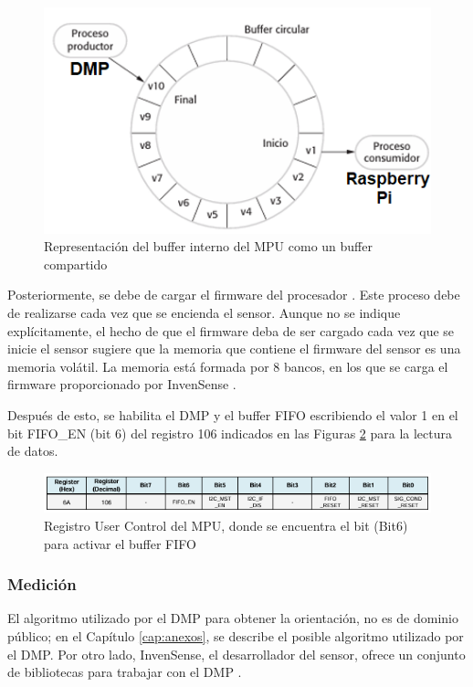 \documentclass[12pt, twoside]{report}
\begin{document}
\begin{figure}[htb]
	\centering
	\includegraphics[scale=0.9]{buffer.png}
	\caption{Representación del buffer interno del MPU como un buffer compartido}
	\label{fig:buffer}
\end{figure}

Posteriormente, se debe de cargar el firmware del procesador \cite{userguideMotionDriver}. Este proceso debe de realizarse cada vez que se encienda el sensor. Aunque no se indique explícitamente, el hecho de que el firmware deba de ser cargado cada vez que se inicie el sensor sugiere que la memoria que contiene el firmware del sensor es una memoria volátil. La memoria está formada por 8 bancos, en los que se carga el firmware proporcionado por InvenSense \cite{userguideMotionDriver}. 

Después de esto, se habilita el DMP y el buffer FIFO escribiendo el valor 1 en el bit FIFO\_EN (bit 6) del registro 106 indicados en las Figuras \ref{fig:fifoen} para la lectura de datos.

\begin{figure}[htb]
	\centering
	\includegraphics[scale=1]{fifoenable.png}
	\caption{Registro User Control del MPU, donde se encuentra el bit (Bit6) para activar el buffer FIFO}
	\label{fig:fifoen}
\end{figure}

\subsubsection{Medición}

El algoritmo utilizado por el DMP para obtener la orientación, no es de dominio público; en el Capítulo \ref{cap:anexos}, se describe el posible algoritmo utilizado por el DMP. Por otro lado, InvenSense, el desarrollador del sensor, ofrece un conjunto de bibliotecas para trabajar con el DMP \cite{userguideMotionDriver}.
\end{document}
